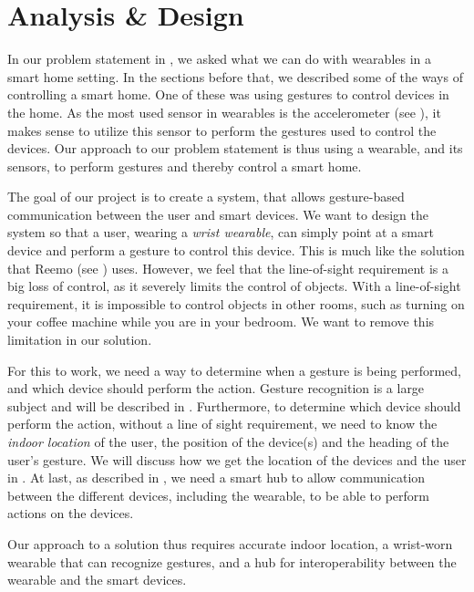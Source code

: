 \chapter{Analysis \& Design}\label{chap:design}\label{chap:analysis}
In our problem statement in , 
we asked what we can do with wearables in a smart home setting.
In the sections before that, 
we described some of the ways of controlling a smart home. 
One of these was using gestures to control devices in the home. 
As the most used sensor in wearables is the accelerometer (see ), 
it makes sense to utilize this sensor to perform the gestures used to control the devices. 
Our approach to our problem statement is thus using a wearable, 
and its sensors, to perform gestures and thereby control a smart home. 

The goal of our project is to create a system, 
that allows gesture-based communication between the user and smart devices.
We want to design the system so that a user, wearing a \emph{wrist wearable}, 
can simply point at a smart device and perform a gesture to control this device. 
This is much like the solution that Reemo (see ) uses. 
However, we feel that the line-of-sight requirement is a big loss of control, 
as it severely limits the control of objects.
With a line-of-sight requirement, 
it is impossible to control objects in other rooms, 
such as turning on your coffee machine while you are in your bedroom. 
We want to remove this limitation in our solution. 

For this to work, we need a way to determine when a gesture is being performed, 
and which device should perform the action. 
Gesture recognition is a large subject and will be described in . 
Furthermore, to determine which device should perform the action, 
without a line of sight requirement, 
we need to know the \emph{indoor location} of the user, 
the position of the device(s) and the heading of the user's gesture. 
We will discuss how we get the location of the devices and the user in .
At last, as described in , 
we need a smart hub to allow communication between the different devices, 
including the wearable, to be able to perform actions on the devices. 

Our approach to a solution thus requires accurate indoor location, 
a wrist-worn wearable that can recognize gestures, 
and a hub for interoperability between the wearable and the smart devices. 




%








